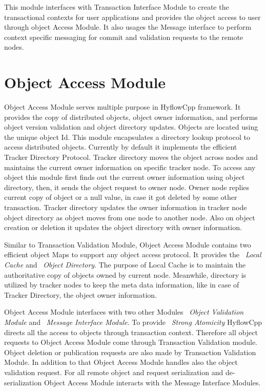 \documentclass[12pt,english]{report}
\begin{document}
This module interfaces with Transaction Interface Module to create the transactional contexts for user applications and provides the object access to user through object Access Module. It also usages the Message interface to perform context specific messaging for commit and validation requests to the remote nodes.

\section{Object Access Module}

Object Access Module serves multiple purpose in HyflowCpp framework. It provides the copy of distributed objects, object owner information, and performs object version validation and object directory updates. Objects are located using the unique object Id. This module encapsulates a directory lookup protocol to access distributed objects. Currently by default it implements the efficient Tracker Directory Protocol. Tracker directory moves the object across nodes and maintains the current owner information on specific tracker node. To access any object this module first finds out the current owner information using object directory, then, it sends the object request to owner node. Owner node replies current copy of object or a null value, in case it got deleted by some other transaction. Tracker directory updates the owner information in tracker node object directory as object moves from one node to another node. Also on object creation or deletion it updates the object directory with owner information. 

Similar to Transaction Validation Module, Object Access Module contains two efficient object Maps to support any object access protocol. It provides the ~\emph{Local Cache} and ~\emph{Object Directory}. The purpose of Local Cache is to maintain the authoritative copy of objects owned by current node. Meanwhile, directory is utilized by tracker nodes to keep the meta data information, like in case of Tracker Directory, the object owner information. 

Object Access Module interfaces with two other Modules ~\emph{Object Validation Module} and ~\emph{Message Interface Module}. To provide ~\emph{Strong Atomicity} HyflowCpp directs all the access to objects through transaction context. Therefore all object requests to Object Access Module come through Transaction Validation module. Object deletion or publication requests are also made by Transaction Validation Module. In addition to that Object Access Module handles also the object validation request. For all remote object and request serialization and de-serialization Object Access Module interacts with the Message Interface Modules.
\end{document}
